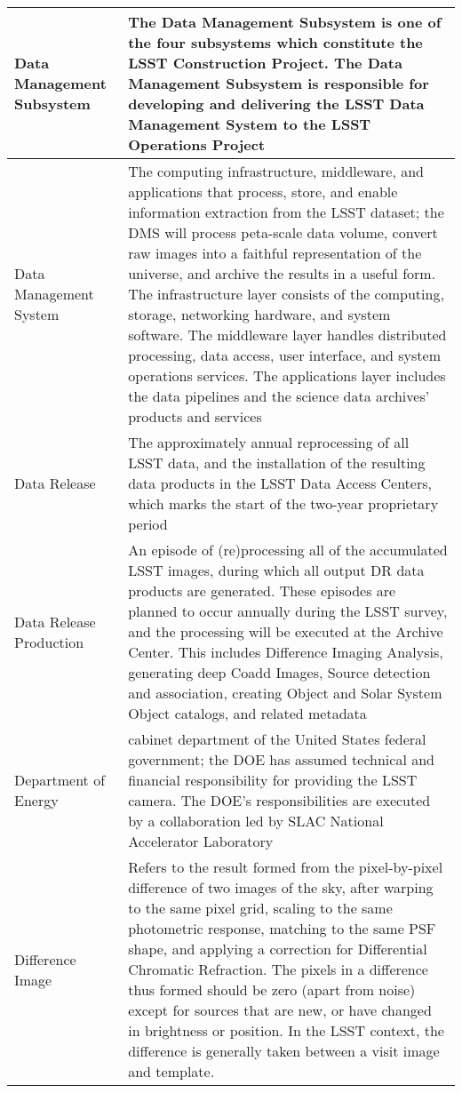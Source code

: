 \begin{longtable}{|p{}|p{}|}
Data Management \gls{Subsystem} & The \gls{Data Management} \gls{Subsystem} is one of the four subsystems which constitute the \gls{LSST} \gls{Construction} Project. The \gls{Data Management} \gls{Subsystem} is responsible for developing and delivering the \gls{LSST} \gls{Data Management} System to the \gls{LSST} \gls{Operations} Project \\\hline
Data Management System & The computing infrastructure, middleware, and applications that process, store, and enable information extraction from the \gls{LSST} dataset; the \gls{DMS} will process peta-scale data volume, convert raw images into a faithful representation of the universe, and archive the results in a useful form. The infrastructure layer consists of the computing, storage, networking hardware, and system software. The middleware layer handles distributed processing, data access, user interface, and system operations services. The applications layer includes the data pipelines and the science data archives' products and services \\\hline
Data Release & The approximately annual reprocessing of all \gls{LSST} data, and the installation of the resulting data products in the \gls{LSST} Data Access Centers, which marks the start of the two-year proprietary period \\\hline
Data Release Production & An episode of (re)processing all of the accumulated \gls{LSST} images, during which all output \gls{DR} data products are generated. These episodes are planned to occur annually during the \gls{LSST} survey, and the processing will be executed at the \gls{Archive} \gls{Center}. This includes Difference Imaging Analysis, generating deep Coadd Images, \gls{Source} detection and association, creating \gls{Object} and Solar System \gls{Object} catalogs, and related \gls{metadata} \\\hline
Department of Energy & cabinet department of the United States federal government; the \gls{DOE} has assumed technical and financial responsibility for providing the \gls{LSST} \gls{camera}. The \gls{DOE}'s responsibilities are executed by a collaboration led by \gls{SLAC} National Accelerator Laboratory \\\hline
Difference Image & Refers to the result formed from the pixel-by-pixel difference of two images of the sky, after warping to the same pixel grid, scaling to the same photometric response, matching to the same \gls{PSF} \gls{shape}, and applying a correction for \gls{Differential Chromatic Refraction}. The pixels in a difference thus formed should be zero (apart from noise) except for sources that are new, or have changed in brightness or position. In the \gls{LSST} context, the difference is generally taken between a visit image and template.  \\\hline

\end{longtable}

